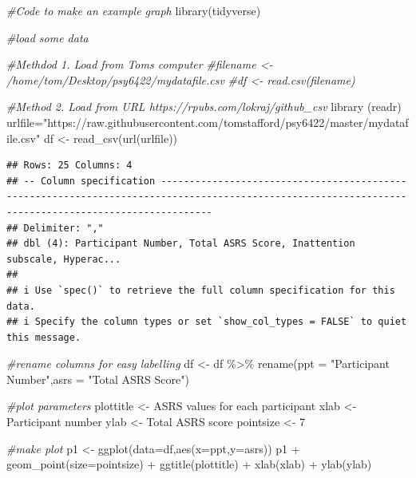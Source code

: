 \documentclass[
]{book}
\newenvironment{Shaded}{\begin{snugshade}}{\end{snugshade}}
\newcommand{\AttributeTok}[1]{\textcolor[rgb]{0.77,0.63,0.00}{#1}}
\newcommand{\CommentTok}[1]{\textcolor[rgb]{0.56,0.35,0.01}{\textit{#1}}}
\newcommand{\DecValTok}[1]{\textcolor[rgb]{0.00,0.00,0.81}{#1}}
\newcommand{\FunctionTok}[1]{\textcolor[rgb]{0.00,0.00,0.00}{#1}}
\newcommand{\NormalTok}[1]{#1}
\newcommand{\OtherTok}[1]{\textcolor[rgb]{0.56,0.35,0.01}{#1}}
\newcommand{\SpecialCharTok}[1]{\textcolor[rgb]{0.00,0.00,0.00}{#1}}
\newcommand{\StringTok}[1]{\textcolor[rgb]{0.31,0.60,0.02}{#1}}
\begin{document}
\begin{Shaded}
\begin{Highlighting}[]
\CommentTok{\#Code to make an example graph}
\FunctionTok{library}\NormalTok{(tidyverse)}

\CommentTok{\#load some data}

\CommentTok{\#Methdod 1. Load from Tom\textquotesingle{}s computer}
\CommentTok{\#filename \textless{}{-} \textquotesingle{}/home/tom/Desktop/psy6422/mydatafile.csv\textquotesingle{}}
\CommentTok{\#df \textless{}{-} read.csv(filename)}

\CommentTok{\#Method 2. Load from URL https://rpubs.com/lokraj/github\_csv}
\FunctionTok{library}\NormalTok{ (readr)}
\NormalTok{urlfile}\OtherTok{=}\StringTok{"https://raw.githubusercontent.com/tomstafford/psy6422/master/mydatafile.csv"}
\NormalTok{df }\OtherTok{\textless{}{-}} \FunctionTok{read\_csv}\NormalTok{(}\FunctionTok{url}\NormalTok{(urlfile))}
\end{Highlighting}
\end{Shaded}

\begin{verbatim}
## Rows: 25 Columns: 4
## -- Column specification -----------------------------------------------------------------------------------------------------------------------------------------------------
## Delimiter: ","
## dbl (4): Participant Number, Total ASRS Score, Inattention subscale, Hyperac...
## 
## i Use `spec()` to retrieve the full column specification for this data.
## i Specify the column types or set `show_col_types = FALSE` to quiet this message.
\end{verbatim}

\begin{Shaded}
\begin{Highlighting}[]
\CommentTok{\#rename columns for easy labelling}
\NormalTok{df }\OtherTok{\textless{}{-}}\NormalTok{ df }\SpecialCharTok{\%\textgreater{}\%} \FunctionTok{rename}\NormalTok{(}\AttributeTok{ppt =} \StringTok{"Participant Number"}\NormalTok{,}\AttributeTok{asrs =} \StringTok{"Total ASRS Score"}\NormalTok{)}

\CommentTok{\#plot parameters}
\NormalTok{plottitle  }\OtherTok{\textless{}{-}}  \StringTok{\textquotesingle{}ASRS values for each participant\textquotesingle{}}
\NormalTok{xlab  }\OtherTok{\textless{}{-}}  \StringTok{\textquotesingle{}Participant number\textquotesingle{}}
\NormalTok{ylab  }\OtherTok{\textless{}{-}}  \StringTok{\textquotesingle{}Total ASRS score\textquotesingle{}}
\NormalTok{pointsize  }\OtherTok{\textless{}{-}}  \DecValTok{7}

\CommentTok{\#make plot}
\NormalTok{p1 }\OtherTok{\textless{}{-}} \FunctionTok{ggplot}\NormalTok{(}\AttributeTok{data=}\NormalTok{df,}\FunctionTok{aes}\NormalTok{(}\AttributeTok{x=}\NormalTok{ppt,}\AttributeTok{y=}\NormalTok{asrs))}
\NormalTok{p1 }\SpecialCharTok{+} \FunctionTok{geom\_point}\NormalTok{(}\AttributeTok{size=}\NormalTok{pointsize) }\SpecialCharTok{+}
  \FunctionTok{ggtitle}\NormalTok{(plottitle) }\SpecialCharTok{+}
  \FunctionTok{xlab}\NormalTok{(xlab) }\SpecialCharTok{+}
  \FunctionTok{ylab}\NormalTok{(ylab)}
\end{Highlighting}
\end{Shaded}
\end{document}

